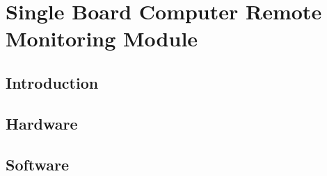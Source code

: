 \chapter{Single Board Computer Remote Monitoring Module}

\section{Introduction}
\section{Hardware}
\section{Software}


